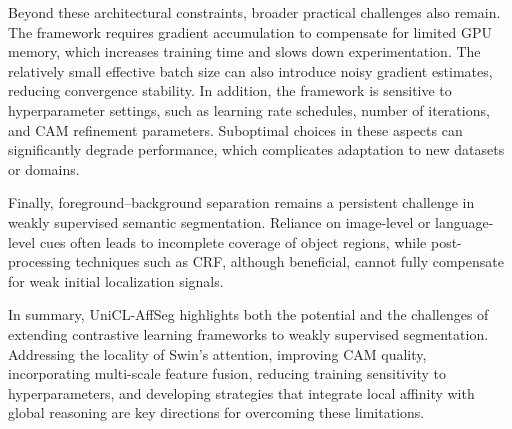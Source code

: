 Beyond these architectural constraints, broader practical challenges also remain. The framework requires gradient accumulation to compensate for limited GPU memory, which increases training time and slows down experimentation. The relatively small effective batch size can also introduce noisy gradient estimates, reducing convergence stability. In addition, the framework is sensitive to hyperparameter settings, such as learning rate schedules, number of iterations, and CAM refinement parameters. Suboptimal choices in these aspects can significantly degrade performance, which complicates adaptation to new datasets or domains.  

Finally, foreground–background separation remains a persistent challenge in weakly supervised semantic segmentation. Reliance on image-level or language-level cues often leads to incomplete coverage of object regions, while post-processing techniques such as CRF, although beneficial, cannot fully compensate for weak initial localization signals.  

In summary, UniCL-AffSeg highlights both the potential and the challenges of extending contrastive learning frameworks to weakly supervised segmentation. Addressing the locality of Swin’s attention, improving CAM quality, incorporating multi-scale feature fusion, reducing training sensitivity to hyperparameters, and developing strategies that integrate local affinity with global reasoning are key directions for overcoming these limitations.
